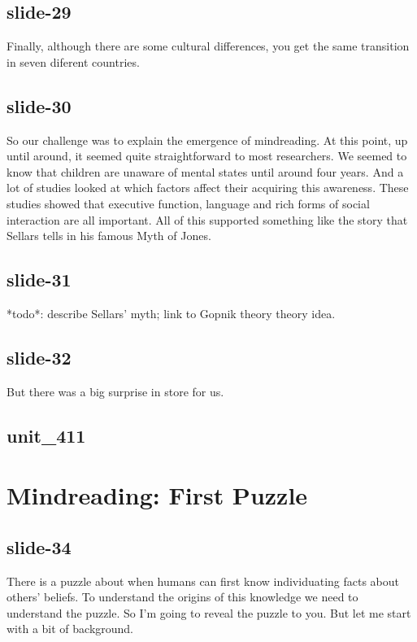 \documentclass[12pt,\papersize]{extarticle}
\begin{document}
 
\subsection{slide-29}
Finally, although there are some cultural differences, you get the same transition in seven diferent countries.
 
 
\subsection{slide-30}
So our challenge was to explain the emergence of mindreading.
At this point, up until around, it seemed quite straightforward to most researchers.
We seemed to know that children are unaware of mental states until around four years.
And a lot of studies looked at which factors affect their acquiring this awareness.
These studies showed that executive function, language and rich forms of social interaction are all important.
All of this supported something like the story that Sellars tells in his famous Myth of Jones.
 
 
\subsection{slide-31}
*todo*: describe Sellars' myth; link to Gopnik theory theory idea.
 
 
\subsection{slide-32}
But there was a big surprise in store for us.
 
 
\subsection{unit\_411}
 
\section{Mindreading: First Puzzle}
 
 
\subsection{slide-34}
There is a puzzle about when humans can first know individuating facts about others' beliefs.
To understand the origins of this knowledge we need to understand the puzzle.
So I'm going to reveal the puzzle to you. But let me start with a bit of background.
 
\end{document}
